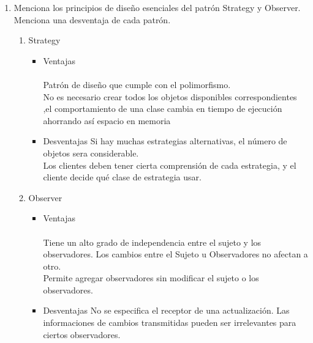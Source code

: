 \documentclass[a4paper,10pt]{article}
\begin{document}
\begin{enumerate}
    
    \item Menciona los principios de diseño esenciales del patrón Strategy y Observer. Menciona una desventaja de cada patrón.
        \begin{enumerate}
            \item Strategy
            \begin{itemize}
                \item \colorbox[rgb]{0.69, 0.93, 0.93}{Ventajas}\\\\
                      Patrón de diseño que cumple con el polimorfismo.\\
                      No es necesario crear todos los objetos disponibles correspondientes ,el comportamiento de una clase cambia en tiempo
                      de ejecución ahorrando así espacio en memoria \\

                \item \colorbox[rgb]{1.0, 0.43, 0.29}{Desventajas}
                      Si hay muchas estrategias alternativas, el número de objetos sera considerable.\\
                      Los clientes deben tener cierta comprensión de cada estrategia, y el cliente decide qué clase de estrategia usar. \\
                      

            \end{itemize}

            \item Observer
            \begin{itemize}
                \item \colorbox[rgb]{0.69, 0.93, 0.93}{Ventajas}\\\\
                      Tiene un alto grado de independencia entre el sujeto y los observadores. Los cambios entre el Sujeto u Observadores no afectan a otro.  \\
                      Permite agregar observadores sin modificar el sujeto o los observadores. \\
                      

                \item \colorbox[rgb]{1.0, 0.43, 0.29}{Desventajas}
                      No se especifica el receptor de una actualización. Las informaciones de cambios transmitidas pueden ser 
                      irrelevantes para ciertos observadores. \\
                      

            \end{itemize}    
            
        \end{enumerate}
        
       
        
                 

\end{enumerate}
\end{document}
